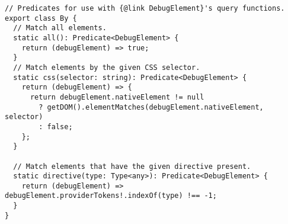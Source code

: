\begin{verbatim}
// Predicates for use with {@link DebugElement}'s query functions.
export class By {
  // Match all elements.
  static all(): Predicate<DebugElement> {
    return (debugElement) => true;
  }
  // Match elements by the given CSS selector.
  static css(selector: string): Predicate<DebugElement> {
    return (debugElement) => {
      return debugElement.nativeElement != null
        ? getDOM().elementMatches(debugElement.nativeElement, selector)
        : false;
    };
  }

  // Match elements that have the given directive present.
  static directive(type: Type<any>): Predicate<DebugElement> {
    return (debugElement) => debugElement.providerTokens!.indexOf(type) !== -1;
  }
}
\end{verbatim}
